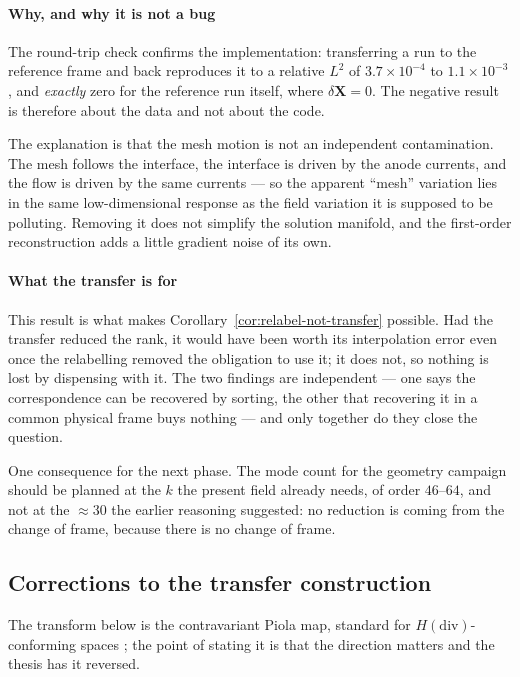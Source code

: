 \documentclass[11pt,a4paper]{article}
\newcommand{\vect}[1]{\mathbf{#1}}
\theoremstyle{plain}
\theoremstyle{definition}
\theoremstyle{remark}
\begin{document}
\label{rem:pilot-why}
\paragraph{Why, and why it is not a bug}
The round-trip check confirms the implementation: transferring a run to the
reference frame and back reproduces it to a relative $L^2$ of
$3.7\times10^{-4}$ to $1.1\times10^{-3}$, and \emph{exactly} zero for the
reference run itself, where $\delta\vect{X} = 0$. The negative result is
therefore about the data and not about the code.

The explanation is that the mesh motion is not an independent contamination. The
mesh follows the interface, the interface is driven by the anode currents, and
the flow is driven by the same currents --- so the apparent ``mesh'' variation
lies in the same low-dimensional response as the field variation it is supposed
to be polluting. Removing it does not simplify the solution manifold, and the
first-order reconstruction adds a little gradient noise of its own.

\label{cor:transfer-purpose}
\paragraph{What the transfer is for}
This result is what makes Corollary~\ref{cor:relabel-not-transfer} possible.
Had the transfer reduced the rank, it would have been worth its interpolation
error even once the relabelling removed the obligation to use it; it does not,
so nothing is lost by dispensing with it. The two findings are independent --- one
says the correspondence can be recovered by sorting, the other that recovering
it in a common physical frame buys nothing --- and only together do they close
the question.

One consequence for the next phase. The mode count for the geometry campaign
should be planned at the $k$ the present field already needs, of order
$46$--$64$, and not at the $\approx30$ the earlier reasoning suggested: no
reduction is coming from the change of frame, because there is no change of
frame.

\subsection{Corrections to the transfer construction}
\label{auto:corrections-to-the-transfer-construction}

The transform below is the contravariant Piola map, standard for
$H(\mathrm{div})$-conforming spaces \cite{bbf}; the point of stating it is that
the direction matters and the thesis has it reversed.
\end{document}

